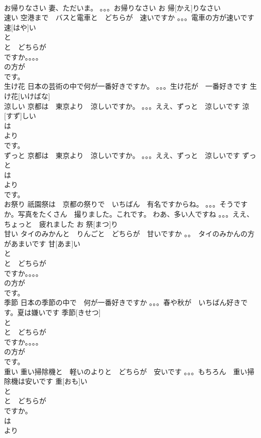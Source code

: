 \documentclass[8pt]{extreport}
\begin{document}
\begin{CJK}{UTF8}{min}
\\	お帰りなさい	妻、ただいま。 。。。お帰りなさい	お 帰[かえ]りなさい			
\\	速い	空港まで　バスと電車と　どちらが　速いですか 。。。電車の方が速いです	速[はや]い			
\\	と
\\	と　どちらが　
\\	ですか。。。。
\\	の方が
\\	です。
\\	生け花	日本の芸術の中で何が一番好きですか。 。。。生け花が　一番好きです	生け花[いけばな]			
\\	涼しい	京都は　東京より　涼しいですか。 。。。ええ、ずっと　涼しいです	涼[すず]しい	
\\	は 
\\	より　
\\	です。
\\	ずっと	京都は　東京より　涼しいですか。 。。。ええ、ずっと　涼しいです	ずっと			
\\	は 
\\	より　
\\	です。
\\	お祭り	祇園祭は　京都の祭りで　いちばん　有名ですからね。 。。。そうですか。写真をたくさん　撮りました。これです。 わあ、多い人ですね 。。。ええ、ちょっと　疲れました	お 祭[まつ]り			
\\	甘い	タイのみかんと　りんごと　どちらが　甘いですか 。。　タイのみかんの方があまいです	甘[あま]い			
\\	と
\\	と　どちらが　
\\	ですか。。。。
\\	の方が
\\	です。
\\	季節	日本の季節の中で　何が一番好きですか 。。。春や秋が　いちばん好きです。夏は嫌いです	季節[きせつ]			
\\	と
\\	と　どちらが　
\\	ですか。。。。
\\	の方が
\\	です。
\\	重い	重い掃除機と　軽いのよりと　どちらが　安いです 。。。もちろん　重い掃除機は安いです	重[おも]い				
\\	と
\\	と　どちらが　
\\	ですか。
\\	は 
\\	より　

\end{CJK}
\end{document}

